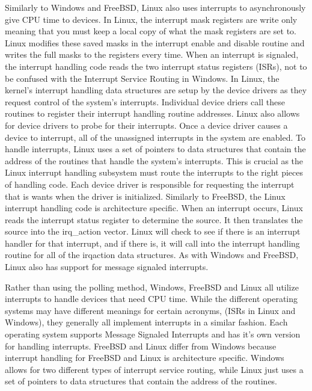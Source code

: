 \documentclass[letterpaper,10pt,draftclsnofoot,onecolumn,titlepage]{IEEEtran}
\begin{document}
	Similarly to Windows and FreeBSD, Linux also uses interrupts to asynchronously give CPU time to devices. \cite{Linux}
	In Linux, the interrupt mask registers are write only meaning that you must keep a local copy of what the mask registers are set to.
	Linux modifies these saved masks in the interrupt enable and disable routine and writes the full masks to the registers every time.
	When an interrupt is signaled, the interrupt handling code reads the two interrupt status registers (ISRs), not to be confused with the Interrupt Service Routing in Windows.
	In Linux, the kernel's interrupt handling data structures are setup by the device drivers as they request control of the system's interrupts.
	Individual device driers call these routines to register their interrupt handling routine addresses.
	Linux also allows for device drivers to probe for their interrupts. Once a device driver causes a device to interrupt, all of the unassigned interrupts in the system are enabled.
	To handle interrupts, Linux uses a set of pointers to data structures that contain the address of the routines that handle the system's interrupts.
	This is crucial as the Linux interrupt handling subsystem must route the interrupts to the right pieces of handling code.
	Each device driver is responsible for requesting the interrupt that is wants when the driver is initialized.
	Similarly to FreeBSD, the Linux interrupt handling code is architecture specific.
	When an interrupt occurs, Linux reads the interrupt status register to determine the source. It then translates the source into the irq\_action vector.
	Linux will check to see if there is an interrupt handler for that interrupt, and if there is, it will call into the interrupt handling routine for all of the irqaction data structures.
	As with Windows and FreeBSD, Linux also has support for message signaled interrupts.

	Rather than using the polling method, Windows, FreeBSD and Linux all utilize interrupts to handle devices that need CPU time.
	While the different operating systems may have different meanings for certain acronyms, (ISRs in Linux and Windows), they generally all implement interrupts in a similar fashion.
	Each operating system supports Message Signaled Interrupts and has it's own version for handling interrupts.
	FreeBSD and Linux differ from Windows because interrupt handling for FreeBSD and Linux is architecture specific.
	Windows allows for two different types of interrupt service routing, while Linux just uses a set of pointers to data structures that contain the address of the routines.
\end{document}

